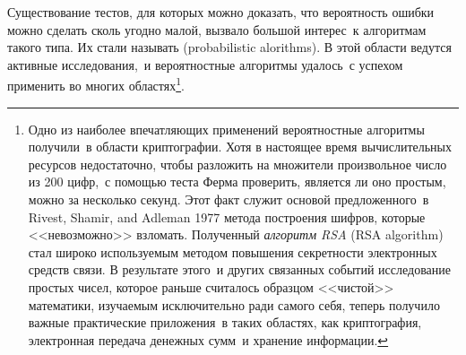 Существование тестов, для которых можно доказать, что
вероятность ошибки можно сделать сколь угодно малой, вызвало большой
интерес~к алгоритмам такого типа.  Их стали называть  (probabilistic alorithms).  В
этой области ведутся активные исследования,~и вероятностные алгоритмы
удалось~с успехом применить во многих областях\footnote{Одно из наиболее впечатляющих применений
вероятностные алгоритмы получили~в области криптографии.  Хотя в
настоящее время вычислительных ресурсов недостаточно, чтобы разложить 
на множители произвольное число из 200 цифр,~с помощью теста Ферма
проверить, является ли оно простым, можно за несколько секунд.  Этот
факт служит основой предложенного~в Rivest, Shamir, and Adleman
1977%
%
%
%
%
%
метода построения шифров, которые <<невозможно>> взломать. Полученный
%
%
%
%
{\em  алгоритм RSA} (RSA algorithm) стал широко
используемым методом повышения секретности электронных средств связи.
В результате этого~и других связанных событий исследование
 простых чисел,
которое раньше считалось образцом <<чистой>> математики, изучаемым
исключительно ради самого себя, теперь получило важные практические
приложения~в таких областях, как 
криптография,
электронная передача 
денежных сумм~и хранение информации.}.

